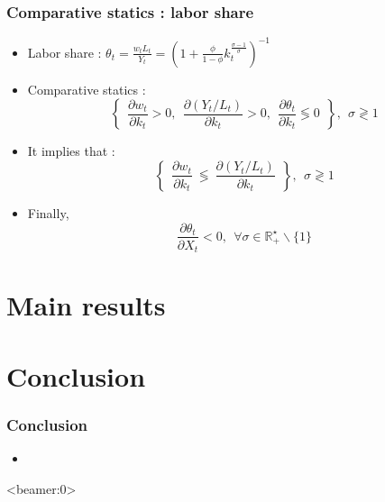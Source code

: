\documentclass[usenames,dvipsnames]{beamer}
\begin{document}
	\begin{frame}\frametitle{Comparative statics : labor share}
		\begin{itemize}
			\item Labor share : $\theta_t = \frac{w_t L_t}{Y_t}=  \left(1+\frac{\phi}{1-\phi}k_t^{\frac{\sigma-1}{\sigma}}\right)^{-1}$
			\item Comparative statics :
			\begin{equation*}
			\left\lbrace ~~
			\frac{\partial w_t}{\partial k_t} > 0,~~
			\frac{\partial (Y_t/L_t)}{\partial k_t} > 0,~~
			\frac{\partial \theta_t}{\partial k_t} \lessgtr 0 ~~
			\right\rbrace, ~~ \sigma \gtrless 1
			\end{equation*}
			\item It implies that :
			\begin{equation*}
			\left\lbrace ~~
			\frac{\partial w_t}{\partial k_t} ~\lessgtr~ \frac{\partial (Y_t/L_t)}{\partial k_t} ~~
			\right\rbrace, ~~ \sigma \gtrless 1
			\end{equation*}
			\item Finally,
			\begin{equation*}
			\frac{\partial \theta_t}{\partial X_t} < 0,~~ \forall \sigma \in \mathbb{R}^\star_+ \smallsetminus\lbrace 1 \rbrace
			\end{equation*}
		\end{itemize}
	\end{frame}
	\section{Main results}
	\section{Conclusion}
	\begin{frame}\frametitle{Conclusion}
		\begin{itemize}
			\item 
		\end{itemize}
	\end{frame}


\appendix

\begin{frame}<beamer:0>
	
	
\end{frame}
\end{document}
